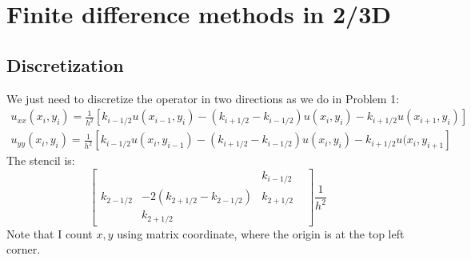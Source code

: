 \documentclass[12pt, fullpage,letterpaper]{article}
\begin{document}
\section{Finite difference methods in 2/3D }
\subsection{Discretization}
We just need to discretize the operator in two directions as we do in Problem 1:
\begin{equation}
\begin{split}
u_{xx}(x_i, y_i) = \frac{1}{h^2} \left[ { k_{i-1/2}u(x_{i-1}, y_i)  - (k_{i+1/2}-k_{i-1/2})u(x_{i}, y_i) -  k_{i+1/2}u(x_{i+1}, y_i) } \right]\\
u_{yy}(x_i, y_i) = \frac{1}{h^2} \left[ {  k_{i-1/2}u(x_{i}, y_{i-1})  - (k_{i+1/2}-k_{i-1/2})u(x_{i}, y_i) -  k_{i+1/2}u(x_{i}, y_{i+1} } \right]
\end{split}
\end{equation}
The stencil is:
\begin{equation}
\begin{bmatrix}
&  & k_{i-1/2} &  \\
k_{2-1/2} & -2(k_{2+1/2}-k_{2-1/2}) & k_{2+1/2}  \\
  &   k_{2+1/2}  &  

\end{bmatrix}  \frac{1}{h^2}
\end{equation}
Note that I count $x, y$ using matrix coordinate, where the origin is at the top left corner.
\end{document}
